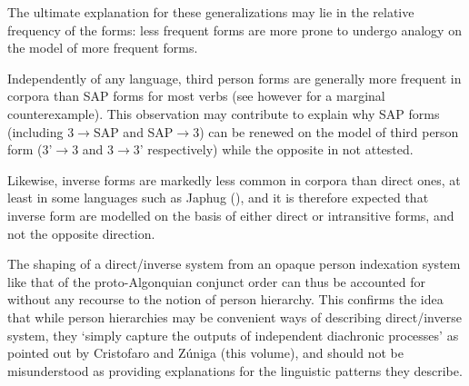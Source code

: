 \documentclass[twoside,a4paper,11pt]{article}
\newcommand{\Σ}{\greek{Σ}}
\begin{document}
The ultimate explanation for these generalizations may lie in the relative frequency of the forms: less frequent forms are more prone to undergo analogy on the model of more frequent forms. 

Independently of any language, third person forms are generally more frequent in corpora than SAP forms for most verbs (see however \citealt{jacques16ebde} for a marginal counterexample).  This observation may contribute to explain why SAP forms (including 3$\rightarrow$SAP and SAP$\rightarrow$3) can be renewed on the model of third person form (3'$\rightarrow$3 and 3$\rightarrow$3' respectively) while the opposite in not attested.
 
Likewise, inverse forms are markedly less common in corpora than direct ones, at least in some languages such as Japhug (\citealt{jacques10inverse}), and it is therefore expected that inverse form are modelled on the basis of either direct or intransitive forms, and not the opposite direction.

 The shaping of a direct/inverse system from an opaque person indexation system like that of the proto-Algonquian conjunct order can thus be accounted for without any recourse to the notion of person hierarchy. This confirms the idea that while person hierarchies may be convenient ways of describing direct/inverse system, they `simply capture the outputs of independent diachronic processes' as pointed out by Cristofaro and Zúniga (this volume), and should not be misunderstood as providing explanations for the linguistic patterns they describe.

 
 
\end{document}
